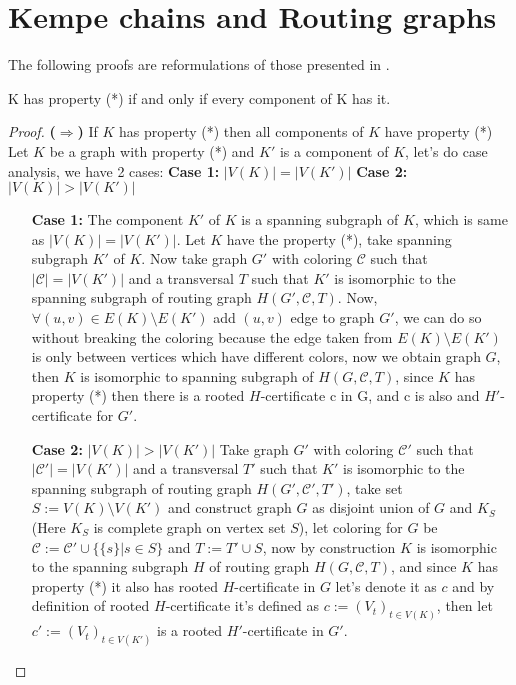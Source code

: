 \chapter{Kempe chains and Routing graphs}
The following proofs are reformulations of those presented in \cite{matthias_2022}.

\begin{thm}
    K has property (*) if and only if every component of K has it.
\end{thm}

\begin{proof} 
\label{thm:first}
    \textbf{(\(\Rightarrow\))} If \(K\) has property (*) then all components of $K$ have property (*)
    \newline \newline
    Let $K$ be a graph with property (*) and $K'$ is a component of $K$, let's do case analysis, we have 2 cases: \newline
    \textbf{Case 1:} $|V(K)| = |V(K')|$ \newline
    \textbf{Case 2:} $|V(K)| > |V(K')|$ 
    \begin{itemize}
        \item [\textbf{Case 1:}]
         The component $K'$ of $K$ is a spanning subgraph of $K$, which is same as $|V(K)| = |V(K')|$.
        \newline
        Let $K$ have the property (*), take spanning subgraph $K'$ of $K$.
         Now take graph $G'$ with coloring $\mathcal{C}$ such that $|\mathcal{C}| = |V(K')|$
          and a transversal $T$ such that $K'$ is isomorphic to the spanning subgraph of routing graph $H(G', \mathcal{C}, T)$.
          Now, $\forall (u,v) \in E(K) \setminus E(K')$ add $(u,v)$ edge to graph $G'$, we can do so without breaking the coloring
          because the edge taken from $E(K) \setminus E(K')$ is only between vertices which have different colors, now we obtain graph $G$,
          then $K$ is isomorphic to spanning subgraph of $H(G, \mathcal{C}, T)$, since $K$ has property (*) then there is a rooted 
          $H$-certificate c in G, and c is also and $H'$-certificate for $G'$.
        \item [\textbf{Case 2:}]
        $|V(K)| > |V(K')|$ 
        \newline
        Take graph $G'$ with coloring $\mathcal{C'}$ such that $|\mathcal{C'}| = |V(K')|$
        and a transversal $T'$ such that $K'$ is isomorphic to the spanning subgraph of routing graph $H(G', \mathcal{C'}, T')$,
        take set $S := V(K) \setminus V(K')$ and construct graph $G$ as disjoint union of $G$ and $K_{S}$(Here $K_{S}$ is complete graph on vertex set $S$),
        let coloring for $G$ be $\mathcal{C} := \mathcal{C'} \cup \{\{s\} | s \in S\}$ and $T := T' \cup S $, now by construction $K$ is isomorphic to the spanning subgraph $H$ of routing graph $H(G, \mathcal{C}, T)$,
         and since $K$ has property (*) it also has rooted $H$-certificate in $G$ let's denote it as $c$ and by definition of rooted $H$-certificate it's defined as $c := (V_{t})_{t \in V(K)}$,
         then let $c' := (V_{t})_{t\in V(K')}$ is a rooted $H'$-certificate in $G'$.
        \newline
    \end{itemize}


\end{proof}
